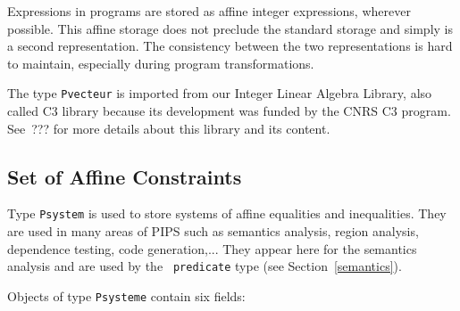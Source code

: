 \iffalse
Un Pvecteur est une suite de mono^mes, un mono^me e'tant un couple
(coefficient,variable).  Le coefficient d'un tel couple est un entier,
positif ou ne'gatif. La variable est une entite', sauf dans le cas du
terme constant qui est repre'sente' par la variable pre'de'finie de nom
{\tt TCST}\footnote{Comme on rajoute le nom des modules devant les
noms de variables, il ne peut pas y avoir de conflict avec une
e'ventuelle variable {\tt TCST}.}.
\fi

Expressions in programs are stored as affine integer expressions,
wherever possible. This affine storage does not preclude the standard
storage and simply is a second representation. The consistency between
the two representations is hard to maintain, especially during program
transformations.

\iffalse
Les expressions apparaissant dans le programme analyse' sont mises
sous cette forme quand c'est possible.
\fi

The type {\tt Pvecteur} is imported from our Integer Linear Algebra
Library, also called C3 library because its development was funded by
the CNRS C3 program. See~??? for more details about this library and its
content.

\iffalse
La structure de donne'es Pvecteur est importe'e de la bibliothe`que d'alge`bre
line'aire en nombres entiers du CRI.
\fi

\subsection{Set of Affine Constraints}
\label{subsection-psysteme}

{}

Type {\tt Psystem} is used to store systems of affine equalities and
inequalities. They are used in many areas of PIPS such as semantics
analysis, region analysis, dependence testing, code generation,... They
appear here for the semantics analysis and are used by the {\tt
predicate} type (see Section~\ref{semantics}).

\iffalse
Le domaine {\tt Psysteme} est utilise' pour repre'senter les syste`mes
d'e'quations et d'ine'quations line'aires qui apparaissent lors
de la phase d'analyse se'mantique (voir le domaine {\tt predicate}).

Les Psystemes sont aussi implicitement utilise's pour effectuer le
calcul de de'pendance.
\fi

Objects of type {\tt Psysteme} contain six fields:

